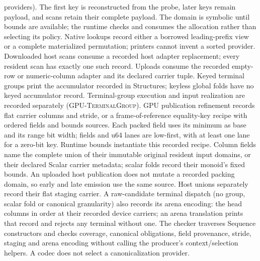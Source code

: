 providers). The first key is
reconstructed from the probe, later keys remain payload, and scans retain their
complete payload. The domain is symbolic until bounds are available; the runtime
checks and consumes the allocation rather than selecting its policy.
Native lookups record either a borrowed leading-prefix view or a complete
materialized permutation; printers cannot invent a sorted provider.
Downloaded host scans consume a recorded host adapter replacement; every
resident scan has exactly one such record. Uploads consume the recorded
empty-row or numeric-column adapter and its declared carrier tuple.
Keyed terminal groups print the accumulator recorded in Structures; keyless
global folds have no keyed accumulator record. Terminal-group execution and
input realization are recorded separately (\textsc{GPU-TerminalGroup}).
GPU publication refinement records flat carrier columns and stride, or a
frame-of-reference equality-key recipe with ordered fields and bounds sources.
Each packed field uses its minimum as base and its range bit width; fields and
u64 lanes are low-first, with at least one lane for a zero-bit key. Runtime
bounds instantiate this recorded recipe. Column fields name the complete union
of their immutable original resident input domains, or their declared Scalar
carrier metadata; scalar folds record their monoid's fixed bounds.
An uploaded host publication does not mutate a recorded packing domain, so
early and late emission use the same source. Host unions separately record
their flat staging carrier. A raw-candidate terminal dispatch (no group,
scalar fold or canonical granularity) also records its arena encoding: the
head columns in order at their recorded device carriers; an arena translation
prints that record and rejects any terminal without one. The checker traverses
Sequence constructors and checks coverage, canonical obligations, field
provenance, stride, staging and arena encoding without calling the producer's
context/selection helpers. A codec does not select a canonicalization provider.


